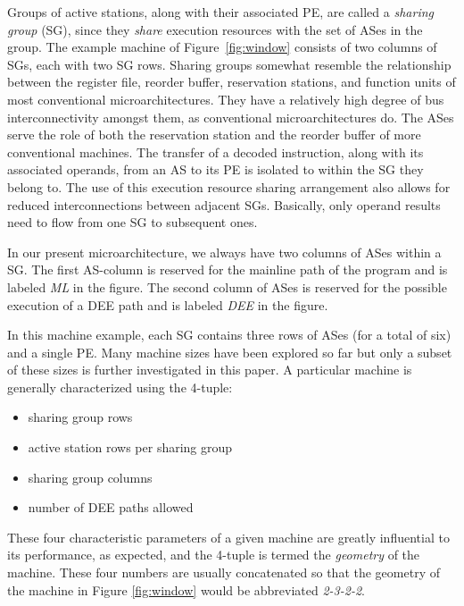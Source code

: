 \documentclass[10pt,twocolumn,dvips]{article}
\begin{document}
Groups of active stations, along with their associated PE,
are called a {\em sharing group} (SG), since they {\em share}  
execution resources with the set of ASes in the group.
The example machine of Figure~\ref{fig:window}
consists of two columns of SGs, each with two SG rows.
Sharing groups somewhat resemble
the relationship between the register file, reorder buffer,
reservation stations, and function units of most conventional
microarchitectures.  They have a relatively high degree of bus
interconnectivity amongst them, as conventional microarchitectures do.
The ASes serve the role of both the
reservation station and the reorder buffer of more conventional
machines.
The transfer of a decoded instruction, along with its associated operands,
from an AS to its PE is isolated to within the SG they belong to.
The use of this execution resource sharing arrangement also allows
for reduced interconnections between adjacent SGs.
Basically, only operand results need to flow from one SG
to subsequent ones.

In our present microarchitecture, we always have two 
columns of ASes within a SG.
The first AS-column is
reserved for the mainline
path of the program and is
labeled {\em ML} in the figure.
The second column of ASes is reserved for the possible
execution of a DEE path and is labeled {\em DEE} in the figure.

In this machine example, each SG contains three rows of ASes
(for a total of six) and a single PE.
Many machine sizes have been explored so far but only a subset
of these sizes is further investigated in this paper.
A particular machine is generally characterized using the 4-tuple: 
%
\begin{itemize}
\item{sharing group rows}
\vspace{-0.10in}
\item{active station rows per sharing group}
\vspace{-0.10in}
\item{sharing group columns}
\vspace{-0.10in}
\item{number of DEE paths allowed}
\end{itemize}   
%
These four characteristic parameters of a given machine
are greatly influential to its performance, as expected,
and the 4-tuple is termed the {\em geometry} 
of the machine.
These four numbers are usually concatenated
so that the geometry of the machine in Figure \ref{fig:window}
would be abbreviated {\em 2-3-2-2}.
\end{document}
